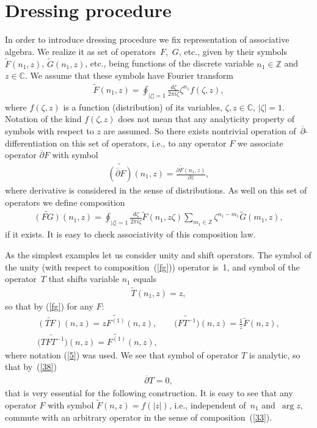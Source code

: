 \documentclass[pdftex]{sigma}
\numberwithin{equation}{section}
\begin{document}
\section{Dressing procedure}\label{dress}

In order to introduce dressing procedure we f\/ix representation of associative algebra. We realize it as set of operators~$F$,~$G$, etc., given by their symbols $\widetilde{F}(n_1,z)$, $\widetilde{G}(n_1,z)$, etc., being functions of the discrete variable $n_1\in\mathbb{Z}$ and $z\in\mathbb{C}$. We assume that these symbols have Fourier transform
\begin{gather}
\widetilde{F}(n_1,z)=\oint_{|\zeta|=1}\frac{d\zeta}{2\pi i\zeta}\zeta^{n_1}f(\zeta,z),\label{f1}
\end{gather}
where $f(\zeta,z)$ is a function (distribution) of its variables, $\zeta,z\in\mathbb{C}$, $|\zeta|=1$. Notation of the kind $f(\zeta,z)$ does not mean that any analyticity property of symbols with respect to $z$ are assumed. So there exists nontrivial operation of~$\overline\partial$-dif\/ferentiation on this set of operators, i.e., to any operator $F$ we associate operator $\overline\partial{F}$ with symbol
\begin{gather}
\widetilde{(\overline{\partial}F)}(n_1,z)=\frac{\partial \widetilde{F}(n_1,z)}{\partial\overline{z}},\label{38}
\end{gather}
where derivative is considered in the sense of distributions. As well on this set of operators we def\/ine composition
\begin{gather}
\widetilde{(FG)}(n_1,z)=\oint_{|\zeta|=1}\frac{d\zeta}{2\pi i\zeta}\widetilde{F}(n_1,z\zeta) \sum_{m_1\in\mathbb{Z}}\zeta^{n_1-m_1}\widetilde{G}(m_1,z),\label{fg}
\end{gather}
if it exists. It is easy to check associativity of this composition law.

As the simplest examples let us consider unity and shift operators. The symbol of the unity (with respect to composition~({\ref{fg}})) operator is~1, and symbol of the operator~$T$ that shifts variable $n_1$ equals
\begin{gather*}
\widetilde{T}(n_1,z)=z,%
\end{gather*}
so that by (\ref{fg}) for any $F$:
\begin{gather}
\widetilde{(TF)}(n,z)=z\widetilde{F^{(1)}}(n,z),\qquad \widetilde{\big(FT^{-1}\big)}(n,z)=\frac{1}{z}\widetilde{F}(n,z),\nonumber\\
\widetilde{\big(TFT^{-1}\big)}(n,z)=\widetilde{F^{(1)}}(n,z),\label{41}
\end{gather}
where notation (\ref{5}) was used. We see that symbol of operator $T$ is analytic, so that by~(\ref{38})
\begin{gather}
 \overline\partial{T}=0,\label{40}
\end{gather}
that is very essential for the following construction. It is easy to see that any operator $F$ with symbol $\widetilde{F}(n,z)=f(|z|)$, i.e., independent of~$n_1$ and~$\arg{z}$, commute with an arbitrary operator in the sense of composition~(\ref{33}).
\end{document}
